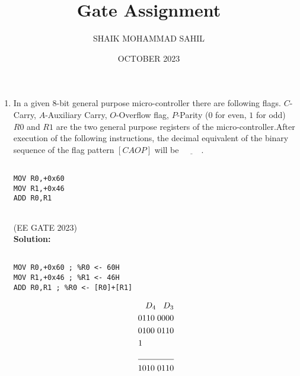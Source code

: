 \documentclass{article}
\title{Gate Assignment}
\author{SHAIK MOHAMMAD SAHIL}
\date{OCTOBER 2023}
\begin{document}
\maketitle

\begin{enumerate}
\item In a given $8$-bit general purpose micro-controller there are following flags. $C$-Carry, $A$-Auxiliary Carry, $O$-Overflow flag, $P$-Parity ($0$ for even, $1$ for odd) $R0$ and $R1$ are the two general purpose registers of the micro-controller.After execution of the following instructions, the decimal equivalent of the binary sequence of the flag pattern $[CAOP]$ will be $\underline{\hspace{1cm}}$.\\


\begin{listing}[h]
\begin{verbatim}

MOV R0,+0x60
MOV R1,+0x46 
ADD R0,R1


\end{verbatim}
\end{listing}
    
		\hfill{(EE GATE 2023)}\\

\textbf{Solution:}\\

\begin{listing}[h]
\begin{verbatim}

MOV R0,+0x60 ; %R0 <- 60H
MOV R1,+0x46 ; %R1 <- 46H
ADD R0,R1 ; %R0 <- [R0]+[R1]

\end{verbatim}
\end{listing}

\begin{align*}
D_{4} \hspace{0.3cm}  D_{3}\\
0110 \hspace{0.1cm} 0000\\
0100 \hspace{0.1cm} 0110\\
1 \hspace{1.32cm}\\
\underline{\hspace{1.5cm}}\\	
1010 \hspace{0.1cm}  0110
\end{align*}


\end{enumerate}
\end{document}
